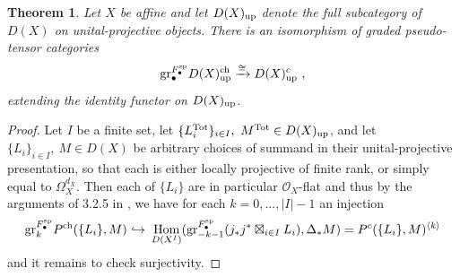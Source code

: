 \documentclass[11pt]{amsart}
\numberwithin{equation}{section}
\newtheorem{theo}{Theorem}[section]
\theoremstyle{definition}
\newcommand{\mc}{\mathcal}
\newcommand{\spe}{{\textup{sp}}}
\DeclareMathOperator{\Hom}{Hom}
\newcommand{\into}{{\ \hookrightarrow\ }}
\newcommand{\ch}{{\textup{ch}}}
\newcommand{\0}{{\textbf{0}}}
\newcommand{\DD}{{D}}
\newcommand{\gr}{\textup{gr}}
\def\ch{{\rm ch}}
\begin{document}
\begin{theo}\label{BDgrclthm} Let $X$ be affine and let $\DD(X)_\textup{up}$ denote the full subcategory of $\DD(X)$ on unital-projective objects. There is an isomorphism of graded pseudo-tensor categories
	\[ \gr_\bullet^{F_\bullet^\spe} \DD(X)_\textup{up}^\ch  \xrightarrow{\cong} \DD(X)_\textup{up}^c \ , \]
	extending the identity functor on $\DD(X)_\textup{up}$.
\end{theo}
\begin{proof} 
	
	Let $I$ be a finite set, let $\{ L_i^\textup{Tot}\}_{i\in I},\ M^\textup{Tot}\in \DD(X)_{\textup{up}}$, and let $\{L_i\}_{i\in I},\ M\in\DD(X)$ be arbitrary choices of summand in their unital-projective presentation, so that each is either locally projective of finite rank, or simply equal to $\Omega_X^{d_X}$. Then each of $\{L_i\}$ are in particular $\mc O_X$-flat and thus by the arguments of 3.2.5 in \cite{BD1}, we have for each $k=0,...,|I|-1$ an injection
	\[ \gr_{ k}^{F^\spe_\bullet} P^\ch(\{L_i\},M) \into \Hom_{\DD(X^I)}( \gr_{-k-1}^{F^\spe_\bullet}(j_*j^*\boxtimes_{i\in I} L_i), \Delta_*M)= P^c(\{L_i\},M)^{\langle  k \rangle} \]
	and it remains to check surjectivity.
	

\end{proof}
\end{document}
